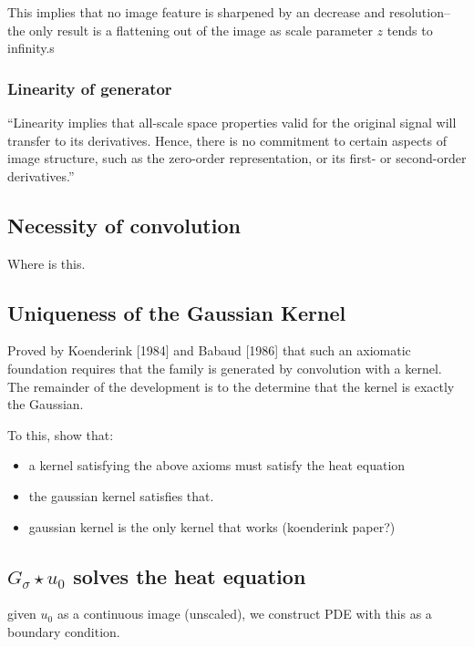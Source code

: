 This implies that no image feature is sharpened by an decrease and resolution--the only result is a flattening out of the image as scale parameter $z$ tends to infinity.s


\subsubsection{Linearity of generator}
``Linearity implies that all-scale space properties valid for the original signal will transfer to its derivatives. Hence, there is no commitment to certain aspects of image structure, such as the zero-order representation, or its first- or second-order derivatives.''


\subsection{Necessity of convolution}
Where is this.
\subsection{Uniqueness of the Gaussian Kernel}
Proved  by Koenderink [1984] and Babaud [1986] that such an axiomatic foundation requires that the family is generated by convolution with a kernel. The remainder of the development is to the determine that the kernel is exactly the Gaussian.

	

To this, show that:
 \begin{itemize}
	 	\item a kernel satisfying the above axioms must satisfy the heat equation
	 	\item the gaussian kernel satisfies that.
	 	\item gaussian kernel is the only kernel that works (koenderink paper?)
 \end{itemize}


\subsection{$G_\sigma \star u_0$ solves the heat equation}
given $u_0$ as a continuous image (unscaled), we construct PDE with this as a boundary condition.

